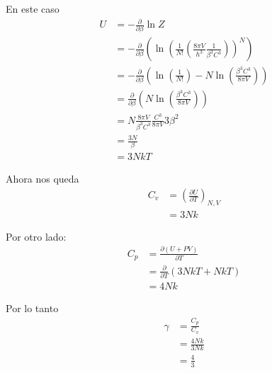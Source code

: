 \documentclass{report}
\begin{document}
En este caso
\begin{align*}
	U &= - \frac{\partial}{\partial \beta} \ln Z\\
	&= - \frac{\partial}{\partial \beta} \left( \ln \left( \frac{1}{N!} \left( \frac{8\pi V}{h^3} \frac{1}{\beta^3 C^3} \right) \right)^N \right)\\
	&= - \frac{\partial}{\partial \beta} \left(\ln \left( \frac{1}{N!} \right) - N \ln \left( \frac{\beta^3 C^3}{8\pi V} \right)\right)\\
	&= \frac{\partial}{\partial \beta} \left( N \ln \left( \frac{\beta^3 C^3}{8\pi V} \right)\right)\\
	&= N \frac{8\pi V}{\beta^3 C^3} \frac{C^3}{8\pi V} 3 \beta^2\\
	&= \frac{3N}{\beta}\\
	&= 3Nk T
\end{align*}

Ahora nos queda
\begin{align*}
	C_v &= \left( \frac{\partial U}{\partial T} \right)_{N, V}\\
	&= 3Nk
\end{align*}

Por otro lado:
\begin{align*}
	C_p &= \frac{\partial \left( U + PV \right)}{\partial T}\\
	&= \frac{\partial}{\partial T} \left( 3NkT + NkT \right)\\
	&= 4Nk
\end{align*}

Por lo tanto
\begin{align*}
	\gamma &= \frac{C_p}{C_v}\\
	&= \frac{4Nk}{3Nk}\\
	&= \frac{4}{3}
\end{align*}



\chapter{}

\section{}
\end{document}
